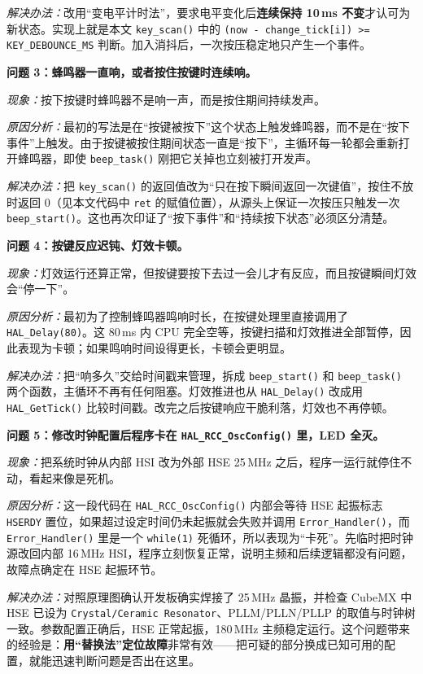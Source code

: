 \documentclass[UTF8,zihao=5,fontset=fandol]{ctexart}
\begin{document}
\begin{reportsection}{\ProcessTitle}{\ProcessHint}
  \emph{解决办法：}改用“变电平计时法”，要求电平变化后\textbf{连续保持 10\,ms 不变}才认可为新状态。实现上就是本文 \texttt{key\_scan()} 中的 \texttt{(now - change\_tick[i]) >= KEY\_DEBOUNCE\_MS} 判断。加入消抖后，一次按压稳定地只产生一个事件。

  \textbf{问题 3：蜂鸣器一直响，或者按住按键时连续响。}

  \emph{现象：}按下按键时蜂鸣器不是响一声，而是按住期间持续发声。

  \emph{原因分析：}最初的写法是在“按键被按下”这个状态上触发蜂鸣器，而不是在“按下事件”上触发。由于按键被按住期间状态一直是“按下”，主循环每一轮都会重新打开蜂鸣器，即使 \texttt{beep\_task()} 刚把它关掉也立刻被打开发声。

  \emph{解决办法：}把 \texttt{key\_scan()} 的返回值改为“只在按下瞬间返回一次键值”，按住不放时返回 0（见本文代码中 \texttt{ret} 的赋值位置），从源头上保证一次按压只触发一次 \texttt{beep\_start()}。这也再次印证了“按下事件”和“持续按下状态”必须区分清楚。

  \textbf{问题 4：按键反应迟钝、灯效卡顿。}

  \emph{现象：}灯效运行还算正常，但按键要按下去过一会儿才有反应，而且按键瞬间灯效会“停一下”。

  \emph{原因分析：}最初为了控制蜂鸣器鸣响时长，在按键处理里直接调用了 \texttt{HAL\_Delay(80)}。这 80\,ms 内 CPU 完全空等，按键扫描和灯效推进全部暂停，因此表现为卡顿；如果鸣响时间设得更长，卡顿会更明显。

  \emph{解决办法：}把“响多久”交给时间戳来管理，拆成 \texttt{beep\_start()} 和 \texttt{beep\_task()} 两个函数，主循环不再有任何阻塞。灯效推进也从 \texttt{HAL\_Delay()} 改成用 \texttt{HAL\_GetTick()} 比较时间戳。改完之后按键响应干脆利落，灯效也不再停顿。

  \textbf{问题 5：修改时钟配置后程序卡在 \texttt{HAL\_RCC\_OscConfig()} 里，LED 全灭。}

  \emph{现象：}把系统时钟从内部 HSI 改为外部 HSE 25\,MHz 之后，程序一运行就停住不动，看起来像是死机。

  \emph{原因分析：}这一段代码在 \texttt{HAL\_RCC\_OscConfig()} 内部会等待 HSE 起振标志 \texttt{HSERDY} 置位，如果超过设定时间仍未起振就会失败并调用 \texttt{Error\_Handler()}，而 \texttt{Error\_Handler()} 里是一个 \texttt{while(1)} 死循环，所以表现为“卡死”。先临时把时钟源改回内部 16\,MHz HSI，程序立刻恢复正常，说明主频和后续逻辑都没有问题，故障点确定在 HSE 起振环节。

  \emph{解决办法：}对照原理图确认开发板确实焊接了 25\,MHz 晶振，并检查 CubeMX 中 HSE 已设为 \texttt{Crystal/Ceramic Resonator}、PLLM/PLLN/PLLP 的取值与时钟树一致。参数配置正确后，HSE 正常起振，180\,MHz 主频稳定运行。这个问题带来的经验是：\textbf{用“替换法”定位故障}非常有效——把可疑的部分换成已知可用的配置，就能迅速判断问题是否出在这里。

\end{reportsection}
\end{document}
